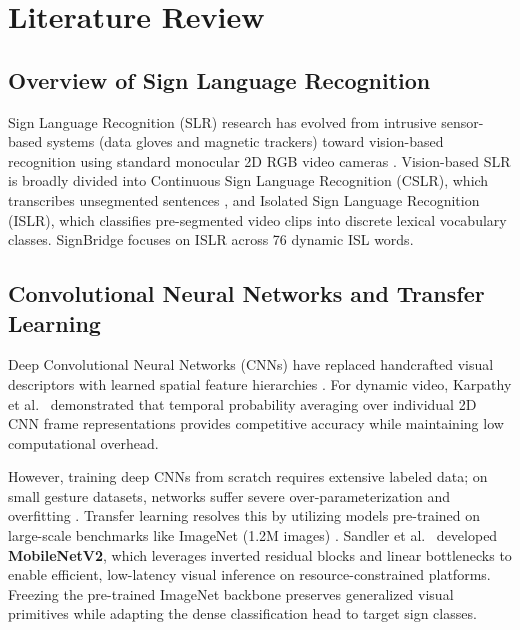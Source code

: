 \chapter{Literature Review}
\label{ch:literature}

\section{Overview of Sign Language Recognition}
\label{sec:lit_slr_overview}
Sign Language Recognition (SLR) research has evolved from intrusive sensor-based systems (data gloves and magnetic trackers) toward vision-based recognition using standard monocular 2D RGB video cameras \cite{starner1998real, rastgoo2021sign, adaloglou2022comprehensive}. Vision-based SLR is broadly divided into Continuous Sign Language Recognition (CSLR), which transcribes unsegmented sentences \cite{koller2019deep, camgoz2018neural}, and Isolated Sign Language Recognition (ISLR), which classifies pre-segmented video clips into discrete lexical vocabulary classes. SignBridge focuses on ISLR across 76 dynamic ISL words.

\section{Convolutional Neural Networks and Transfer Learning}
\label{sec:lit_cnn_transfer}
Deep Convolutional Neural Networks (CNNs) have replaced handcrafted visual descriptors with learned spatial feature hierarchies \cite{simonyan2014very, he2016deep}. For dynamic video, Karpathy et al.~\cite{karpathy2014large} demonstrated that temporal probability averaging over individual 2D CNN frame representations provides competitive accuracy while maintaining low computational overhead. 

However, training deep CNNs from scratch requires extensive labeled data; on small gesture datasets, networks suffer severe over-parameterization and overfitting \cite{yosinski2014transferable}. Transfer learning resolves this by utilizing models pre-trained on large-scale benchmarks like ImageNet (1.2M images) \cite{deng2009imagenet}. Sandler et al.~\cite{sandler2018mobilenetv2} developed \textbf{MobileNetV2}, which leverages inverted residual blocks and linear bottlenecks to enable efficient, low-latency visual inference on resource-constrained platforms. Freezing the pre-trained ImageNet backbone preserves generalized visual primitives while adapting the dense classification head to target sign classes.

